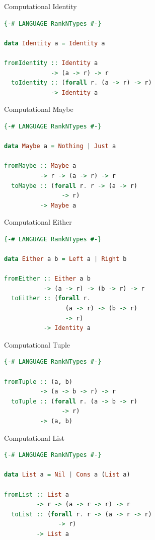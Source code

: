 \documentclass[utf8x,notes,17pt]{beamer}
\begin{document}
\begin{frame}[fragile,label=sec-7-30]{Computational Identity}
\lstset{basicstyle=\footnotesize\ttfamily}
\begin{lstlisting}[language=Haskell]
{-# LANGUAGE RankNTypes #-}

data Identity a = Identity a

fromIdentity :: Identity a
             -> (a -> r) -> r
  toIdentity :: (forall r. (a -> r) -> r)
             -> Identity a
\end{lstlisting}
\end{frame}
\begin{frame}[fragile,label=sec-7-31]{Computational Maybe}
\lstset{basicstyle=\footnotesize\ttfamily}
\begin{lstlisting}[language=Haskell]
{-# LANGUAGE RankNTypes #-}

data Maybe a = Nothing | Just a

fromMaybe :: Maybe a
          -> r -> (a -> r) -> r
  toMaybe :: (forall r. r -> (a -> r)
                -> r)
          -> Maybe a
\end{lstlisting}
\end{frame}
\begin{frame}[fragile,label=sec-7-32]{Computational Either}
\lstset{basicstyle=\footnotesize\ttfamily}
\begin{lstlisting}[language=Haskell]
{-# LANGUAGE RankNTypes #-}

data Either a b = Left a | Right b

fromEither :: Either a b
           -> (a -> r) -> (b -> r) -> r
  toEither :: (forall r.
                 (a -> r) -> (b -> r)
                 -> r)
           -> Identity a
\end{lstlisting}
\end{frame}
\begin{frame}[fragile,label=sec-7-33]{Computational Tuple}
\lstset{basicstyle=\footnotesize\ttfamily}
\begin{lstlisting}[language=Haskell]
{-# LANGUAGE RankNTypes #-}

fromTuple :: (a, b)
          -> (a -> b -> r) -> r
  toTuple :: (forall r. (a -> b -> r)
                -> r)
          -> (a, b)
\end{lstlisting}
\end{frame}
\begin{frame}[fragile,label=sec-7-34]{Computational List}
\lstset{basicstyle=\footnotesize\ttfamily}
\begin{lstlisting}[language=Haskell]
{-# LANGUAGE RankNTypes #-}

data List a = Nil | Cons a (List a)

fromList :: List a
         -> r -> (a -> r -> r) -> r
  toList :: (forall r. r -> (a -> r -> r)
               -> r)
         -> List a
\end{lstlisting}
\end{frame}
\end{document}
